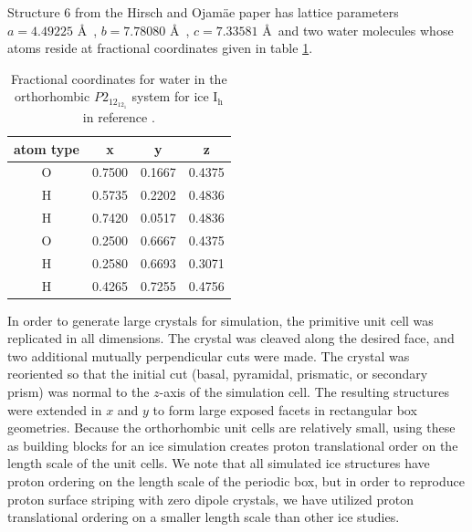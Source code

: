 Structure 6 from the Hirsch and Ojam\"{a}e paper has lattice
parameters $a = 4.49225$ \AA\ , $b = 7.78080$ \AA\ , $c = 7.33581$
\AA\ and two water molecules whose atoms reside at fractional
coordinates given in table
\ref{tab:p212121}. 

\begin{table}[h]
\centering
  \caption{Fractional coordinates for water in the orthorhombic
    $P2_12_12_1$ system for ice I$_\mathrm{h}$ in reference  \protect\citep{Hirsch04}.}
\label{tab:p212121}
\begin{tabular}{|cccc|}  \hline
atom type & x & y & z \\ \hline
 O & 0.7500 & 0.1667 & 0.4375 \\
 H & 0.5735 & 0.2202 & 0.4836 \\
 H & 0.7420 & 0.0517 & 0.4836 \\
 O & 0.2500 & 0.6667 & 0.4375 \\
 H & 0.2580 & 0.6693 & 0.3071 \\
 H & 0.4265 & 0.7255 & 0.4756 \\ \hline
\end{tabular}
\end{table}


In order to generate large crystals for simulation, the primitive unit
cell was replicated in all dimensions. The crystal was cleaved along
the desired face, and two additional mutually perpendicular cuts were
made.  The crystal was reoriented so that the initial cut (basal,
pyramidal, prismatic, or secondary prism) was normal to the $z$-axis
of the simulation cell.  The resulting structures were extended in $x$
and $y$ to form large exposed facets in rectangular box geometries.
Because the orthorhombic unit cells are relatively small, using these
as building blocks for an ice simulation creates proton translational
order on the length scale of the unit cells. We note that all
simulated ice structures have proton ordering on the length scale of
the periodic box, but in order to reproduce proton surface striping
with zero dipole crystals, we have utilized proton translational
ordering on a smaller length scale than other ice studies.

